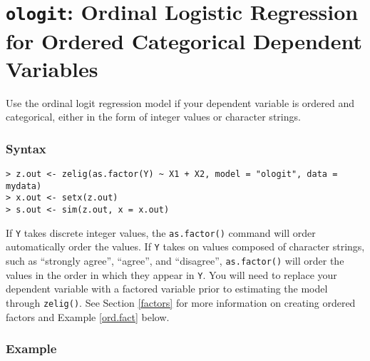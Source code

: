 \section{{\tt ologit}: Ordinal Logistic Regression for Ordered
Categorical Dependent Variables}\label{ologit}

Use the ordinal logit regression model if your dependent variable is
ordered and categorical, either in the form of integer values or character strings.  

\subsubsection{Syntax}

\begin{verbatim}
> z.out <- zelig(as.factor(Y) ~ X1 + X2, model = "ologit", data = mydata)
> x.out <- setx(z.out)
> s.out <- sim(z.out, x = x.out)
\end{verbatim}
If {\tt Y} takes discrete integer values, the {\tt as.factor()}
command will order automatically order the values.  If {\tt Y} takes
on values composed of character strings, such as ``strongly agree'',
``agree'', and ``disagree'', {\tt as.factor()} will order the values
in the order in which they appear in {\tt Y}.  You will need to
replace your dependent variable with a factored variable prior to
estimating the model through {\tt zelig()}.  See Section \ref{factors}
for more information on creating ordered factors and Example
\ref{ord.fact} below.

\subsubsection{Example}

